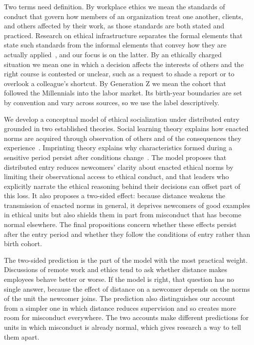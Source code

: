\documentclass[12pt,a4paper]{article}
\theoremstyle{definition}
\begin{document}
Two terms need definition. By workplace ethics we mean the standards of conduct that govern how members of an organization treat one another, clients, and others affected by their work, as those standards are both stated and practiced. Research on ethical infrastructure separates the formal elements that state such standards from the informal elements that convey how they are actually applied~\citep{tenbrunsel2003building}, and our focus is on the latter. By an ethically charged situation we mean one in which a decision affects the interests of others and the right course is contested or unclear, such as a request to shade a report or to overlook a colleague's shortcut. By Generation Z we mean the cohort that followed the Millennials into the labor market. Its birth-year boundaries are set by convention and vary across sources, so we use the label descriptively.

We develop a conceptual model of ethical socialization under distributed entry grounded in two established theories. Social learning theory explains how enacted norms are acquired through observation of others and of the consequences they experience~\citep{bandura1977social}. Imprinting theory explains why characteristics formed during a sensitive period persist after conditions change~\citep{marquis2013imprinting}. The model proposes that distributed entry reduces newcomers' clarity about enacted ethical norms by limiting their observational access to ethical conduct, and that leaders who explicitly narrate the ethical reasoning behind their decisions can offset part of this loss. It also proposes a two-sided effect: because distance weakens the transmission of enacted norms in general, it deprives newcomers of good examples in ethical units but also shields them in part from misconduct that has become normal elsewhere. The final propositions concern whether these effects persist after the entry period and whether they follow the conditions of entry rather than birth cohort.

The two-sided prediction is the part of the model with the most practical weight. Discussions of remote work and ethics tend to ask whether distance makes employees behave better or worse. If the model is right, that question has no single answer, because the effect of distance on a newcomer depends on the norms of the unit the newcomer joins. The prediction also distinguishes our account from a simpler one in which distance reduces supervision and so creates more room for misconduct everywhere. The two accounts make different predictions for units in which misconduct is already normal, which gives research a way to tell them apart.
\end{document}
